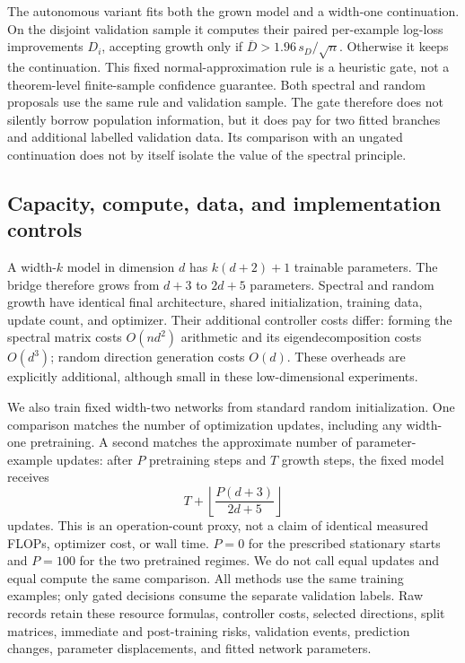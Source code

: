 The autonomous variant fits both the grown model and a width-one continuation.
On the disjoint validation sample it computes their paired per-example log-loss
improvements $D_i$, accepting growth only if
$\overline D>1.96\,s_D/\sqrt n$. Otherwise it keeps the continuation.
This fixed normal-approximation rule is a heuristic gate, not a theorem-level
finite-sample confidence guarantee. Both spectral and random proposals use the
same rule and validation sample. The gate therefore does not silently borrow
population information, but it does pay for two fitted branches and additional
labelled validation data. Its comparison with an ungated continuation does not
by itself isolate the value of the spectral principle.

\subsection{Capacity, compute, data, and implementation controls}

A width-$k$ model in dimension $d$ has $k(d+2)+1$ trainable parameters. The bridge
therefore grows from $d+3$ to $2d+5$ parameters. Spectral and random growth have
identical final architecture, shared initialization, training data, update count,
and optimizer. Their additional controller costs differ: forming the spectral
matrix costs $O(nd^2)$ arithmetic and its eigendecomposition costs $O(d^3)$;
random direction generation costs $O(d)$. These overheads are explicitly
additional, although small in these low-dimensional experiments.

We also train fixed width-two networks from standard random initialization.
One comparison matches the number of optimization updates, including any
width-one pretraining. A second matches the approximate number of
parameter-example updates: after $P$ pretraining steps and $T$ growth steps,
the fixed model receives
\[
 T+\left\lfloor\frac{P(d+3)}{2d+5}\right\rfloor
\]
updates. This is an operation-count proxy, not a claim of identical measured
FLOPs, optimizer cost, or wall time. $P=0$ for the prescribed stationary starts
and $P=100$ for the two pretrained regimes. We do not call equal updates and
equal compute the same comparison. All methods use the same training examples;
only gated decisions consume the separate validation labels. Raw records retain
these resource formulas, controller costs, selected directions, split matrices,
immediate and post-training risks, validation events, prediction changes,
parameter displacements, and fitted network parameters.

